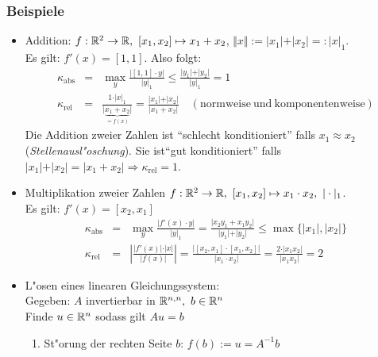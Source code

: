 \documentclass{scrartcl}
\begin{document}
\subsubsection{Beispiele}
\begin{itemize}
\item Addition: $f: \RR^2 \rightarrow \RR, \ [x_1, x_2] \mapsto x_1 + x_2$, $\Vert x \Vert := \vert x_1 \vert + \vert x_2 \vert =: \vert x \vert_1$. \\
Es gilt: $f'(x) = [1,1]$. Also folgt: 
\begin{eqnarray*}
\kappa_\mathrm{abs} & = & \max\limits_y \frac{ \vert [1,1] \cdot y \vert }{\vert y \vert_1} \leq \frac{ \vert y_1 \vert + \vert y_2 \vert }{\vert y \vert_1} = 1 \\
\kappa_\mathrm{rel} & = & \frac{ 1 \cdot \vert x \vert_1 }{ \vert \underbrace{x_1 + x_2}_{=f(x)} \vert} = \frac{\vert x_1 \vert + \vert x_2 \vert}{ \vert x_1 + x_2 \vert} \quad (\mathrm{normweise \ und \ komponentenweise})
\end{eqnarray*}
Die Addition zweier Zahlen ist "`schlecht konditioniert"' falls $x_1 \approx x_2$ (\emph{Stellenausl"oschung}). Sie ist"`gut konditioniert"' falls $\vert x_1 \vert + \vert x_2 \vert = \vert x_1 + x_2 \vert \Rightarrow \kappa_\mathrm{rel} = 1$.
\item Multiplikation zweier Zahlen $f: \mathbb{R}^2 \rightarrow \mathbb{R}, \ [x_1, x_2] \mapsto x_1 \cdot x_2, \ \vert \cdot \vert_1$. \\
Es gilt: $f'(x) = [x_2, x_1]$
\begin{eqnarray*}
\kappa_\mathrm{abs} & = & \max\limits_y \frac{ \vert f'(x) \cdot y \vert }{ \vert y \vert_1} = \frac{ \vert x_2 y_1 + x_1 y_2 \vert }{ \vert y_1 \vert + \vert y_2 \vert } \leq \max \{ \vert x_1\vert, \vert x_2 \vert \} \\
\kappa_\mathrm{rel} & = & \left\vert \frac{ \vert f'(x) \vert \cdot \vert x \vert }{ \vert f(x) \vert } \right\vert = \frac{ \vert [x_2, x_1 ] \cdot [x_1, x_2] \vert}{ \vert x_1 \cdot x_2 \vert } = \frac{ 2 \cdot \vert x_1x_2 \vert }{\vert x_1 x_2 \vert} = 2 
\end{eqnarray*}
\item L"osen eines linearen Gleichungssystem: \\
Gegeben: $A$ invertierbar in $\mathbb{R}^{n,n}, \ b \in \mathbb{R}^n$ \\
Finde $u \in \mathbb{R}^n$ sodass gilt  $Au = b$
\begin{enumerate}
\item St"orung der rechten Seite $b$: $f(b)  := u = A^{-1} b$ \\

\end{enumerate}
\end{itemize}
\end{document}
